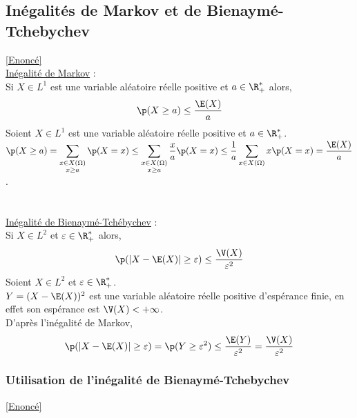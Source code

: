 \documentclass[8pt]{book}
\begin{document}
	\subsection{Inégalités de Markov et de Bienaymé-Tchebychev }
	\label{Inégalités de Markov et de Bienaymé-Tchebychev corrigé}
	\textcolor{blue}{\hyperref[Inégalités de Markov et de Bienaymé-Tchebychev]{[Enoncé]}}\\
	\underline{Inégalité de Markov} :\\
	Si $X\in L^1$ est une variable aléatoire réelle positive et $a\in \R^*_+$ alors,
	$$\p(X\geq a)\leq \displaystyle\frac{\E(X)}{a}$$
	Soient $X\in L^1$ est une variable aléatoire réelle positive et $a\in \R^*_+$.\\
	$\p(X\geq a)=\displaystyle\sum\limits_{\substack{x\in X(\Omega)\\x\geq a}}\p(X=x)\leq \displaystyle\sum\limits_{\substack{x\in X(\Omega)\\x\geq a}}\frac{x}{a}\p(X=x)\leq \displaystyle\frac{1}{a}\sum\limits_{x\in X(\Omega)}x\p(X=x)=\displaystyle\frac{\E(X)}{a}$.\\\\\\
	\underline{Inégalité de Bienaymé-Tchébychev} :\\
	Si $X\in L^2$ et $\varepsilon\in \R^*_+$ alors,
	$$\p(|X-\E(X)|\geq\varepsilon)\leq\displaystyle\frac{\V(X)}{\varepsilon^2}$$
	Soient $X\in L^2$ et $\varepsilon\in \R^*_+$.\\
	$Y=(X-\E(X))^2$ est une variable aléatoire réelle positive d'espérance finie, en effet son espérance est $\V(X)<+\infty$.\\
	D'après l'inégalité de Markov,
	$$\p(|X-\E(X)|\geq\varepsilon)=\p(Y\geq \varepsilon^2)\leq\displaystyle\frac{\E(Y)}{\varepsilon^2}=\frac{\V(X)}{\varepsilon^2}$$
	
	\subsubsection{Utilisation de l'inégalité de Bienaymé-Tchebychev}
	\label{Utilisation de l'inégalité de Bienaymé-Tchebychev corrigé}
	\textcolor{blue}{\hyperref[Utilisation de l'inégalité de Bienaymé-Tchebychev]{[Enoncé]}}\\
	
\end{document}
